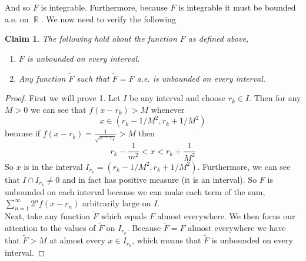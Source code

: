 \documentclass{article}
\DeclareMathOperator{\R}{\mathbb{R}}
\newtheorem*{claim}{Claim}
\begin{document}
And so $F$ is integrable. Furthermore, because $F$ is integrable it must be bounded a.e. on $\R$. We now need to verify the following \\
\begin{claim}
The following hold about the function $F$ as defined above,
\begin{enumerate}
\item $F$ is unbounded on every interval.
\item Any function $\tilde{F}$ such that $\tilde{F} = F$ a.e. is unbounded on every interval.
\end{enumerate}
\end{claim}
\begin{proof}
First we will prove 1. Let $I$ be any interval and choose $r_k \in I$. Then for any $M > 0$ we can see that $f(x - r_k) > M$ whenever
\[
x \in (r_k - 1/M^2, r_k + 1/M^2)
\]
because if $f(x - r_k) = \frac{1}{\sqrt{x - r_k}} > M$ then 
\[
r_k - \frac{1}{m^2} < x < r_k + \frac{1}{M^2}
\] 
So $x$ is in the interval $I_{r_k} = (r_k - 1/M^2, r_k + 1/M^2)$. Furthermore, we can see that $I \cap I_{r_k} \neq 0$ and in fact has positive measure (it is an interval). So $F$ is unbounded on each interval because we can make each term of the sum, $\sum_{n=1}^\infty 2^nf(x-r_n)$ arbitrarily large on $I$. \\
\indent Next, take any function $\tilde{F}$ which equals $F$ almost everywhere. We then focus our attention to the values of $\tilde{F}$ on $I_{r_k}$. Because $\tilde{F} = F$ almost everywhere we have that $\tilde{F} > M$ at almost every $x \in I_{r_k}$, which means that $\tilde{F}$ is unbounded on every interval.     
\end{proof}
\end{document}
